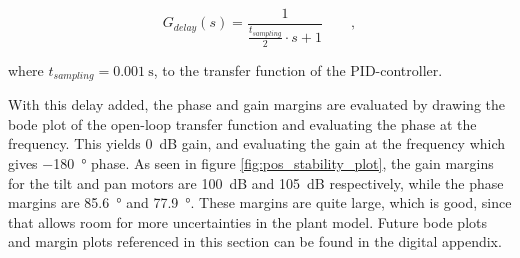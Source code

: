 \documentclass[../../main.tex]{subfiles}
\begin{document}
\begin{equation}\label{eq:delay_transfer_function}
    G_{delay}(s) = \frac{1}{\frac{t_{sampling}}{2}\cdot s+1} \qquad ,
\end{equation}

where $t_{sampling} = \SI{0.001}{\second}$, to the transfer function of the PID-controller. 

With this delay added, the phase and gain margins are evaluated by drawing the bode plot of the open-loop transfer function and evaluating the phase at the frequency. This yields \SI{0}{\deci \bel} gain, and evaluating the gain at the frequency which gives \SI{-180}{\degree} phase. As seen in figure \ref{fig:pos_stability_plot}, the gain margins for the tilt and pan motors are \SI{100}{\deci \bel} and \SI{105}{\deci \bel} respectively, while the phase margins are \SI{85.6}{\degree} and \SI{77.9}{\degree}. These margins are quite large, which is good, since that allows room for more uncertainties in the plant model. Future bode plots and margin plots referenced in this section can be found in the digital appendix.
\end{document}
